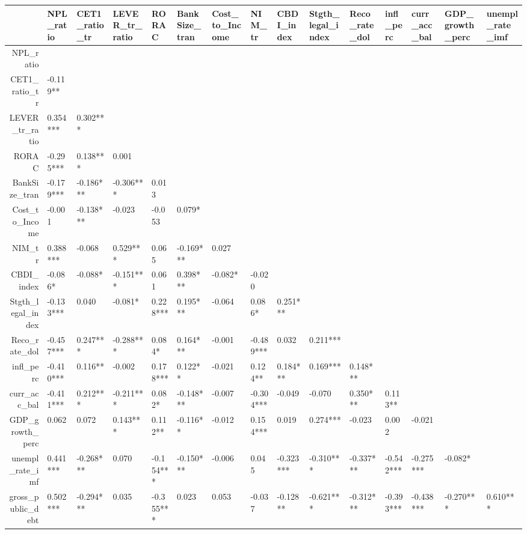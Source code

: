\begin{table}[ht]
\centering
\begin{tabular}{rllllllllllllll}
  \hline
 & NPL\_ratio & CET1\_ratio\_tr & LEVER\_tr\_ratio & RORAC & BankSize\_tran & Cost\_to\_Income & NIM\_tr & CBDI\_index & Stgth\_legal\_index & Reco\_rate\_dol & infl\_perc & curr\_acc\_bal & GDP\_growth\_perc & unempl\_rate\_imf \\ 
  \hline
NPL\_ratio &  &  &  &  &  &  &  &  &  &  &  &  &  &  \\ 
  CET1\_ratio\_tr & -0.119**   &  &  &  &  &  &  &  &  &  &  &  &  &  \\ 
  LEVER\_tr\_ratio &  0.354*** &  0.302*** &  &  &  &  &  &  &  &  &  &  &  &  \\ 
  RORAC & -0.295*** &  0.138***  &  0.001     &  &  &  &  &  &  &  &  &  &  &  \\ 
  BankSize\_tran & -0.179*** & -0.186*** & -0.306*** &  0.013     &  &  &  &  &  &  &  &  &  &  \\ 
  Cost\_to\_Income & -0.001     & -0.138***  & -0.023     & -0.053     &  0.079*    &  &  &  &  &  &  &  &  &  \\ 
  NIM\_tr &  0.388*** & -0.068     &  0.529*** &  0.065     & -0.169*** &  0.027     &  &  &  &  &  &  &  &  \\ 
  CBDI\_index & -0.086*    & -0.088*    & -0.151***  &  0.061     &  0.398*** & -0.082*    & -0.020     &  &  &  &  &  &  &  \\ 
  Stgth\_legal\_index & -0.133***  &  0.040     & -0.081*    &  0.228*** &  0.195*** & -0.064     &  0.086*    &  0.251*** &  &  &  &  &  &  \\ 
  Reco\_rate\_dol & -0.457*** &  0.247*** & -0.288*** &  0.084*    &  0.164*** & -0.001     & -0.489*** &  0.032     &  0.211*** &  &  &  &  &  \\ 
  infl\_perc & -0.410*** &  0.116**   & -0.002     &  0.178*** &  0.122**   & -0.021     &  0.124**   &  0.184*** &  0.169*** &  0.148***  &  &  &  &  \\ 
  curr\_acc\_bal & -0.411*** &  0.212*** & -0.211*** &  0.082*    & -0.148***  & -0.007     & -0.304*** & -0.049     & -0.070     &  0.350*** &  0.113**   &  &  &  \\ 
  GDP\_growth\_perc &  0.062     &  0.072     &  0.143***  &  0.112**   & -0.116**   & -0.012     &  0.154***  &  0.019     &  0.274*** & -0.023     &  0.002     & -0.021     &  &  \\ 
  unempl\_rate\_imf &  0.441*** & -0.268*** &  0.070     & -0.154***  & -0.150***  & -0.006     &  0.045     & -0.323*** & -0.310*** & -0.337*** & -0.542*** & -0.275*** & -0.082*    &  \\ 
  gross\_public\_debt &  0.502*** & -0.294*** &  0.035     & -0.355*** &  0.023     &  0.053     & -0.037     & -0.128**   & -0.621*** & -0.312*** & -0.393*** & -0.438*** & -0.270*** &  0.610*** \\ 
   \hline
\end{tabular}
\end{table}
